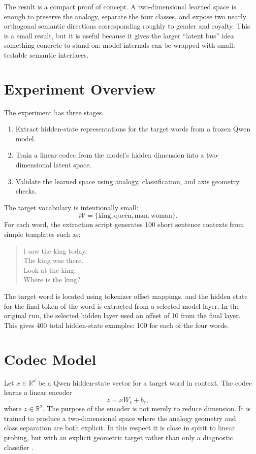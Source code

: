 \documentclass[11pt]{article}
\begin{document}
The result is a compact proof of concept. A two-dimensional learned space is
enough to preserve the analogy, separate the four classes, and expose two
nearly orthogonal semantic directions corresponding roughly to gender and
royalty. This is a small result, but it is useful because it gives the larger
``latent bus'' idea something concrete to stand on: model internals can be
wrapped with small, testable semantic interfaces.

\section{Experiment Overview}

The experiment has three stages.

\begin{enumerate}
  \item Extract hidden-state representations for the target words from a frozen
  Qwen model.
  \item Train a linear codec from the model's hidden dimension into a
  two-dimensional latent space.
  \item Validate the learned space using analogy, classification, and axis
  geometry checks.
\end{enumerate}

The target vocabulary is intentionally small:
\[
  \mathcal{W} = \{\mathrm{king}, \mathrm{queen}, \mathrm{man}, \mathrm{woman}\}.
\]
For each word, the extraction script generates 100 short sentence contexts from
simple templates such as:

\begin{quote}
I saw the king today. \\
The king was there. \\
Look at the king. \\
Where is the king?
\end{quote}

The target word is located using tokenizer offset mappings, and the hidden state
for the final token of the word is extracted from a selected model layer. In
the original run, the selected hidden layer used an offset of 10 from the final
layer. This gives 400 total hidden-state examples: 100 for each of the four
words.

\section{Codec Model}

Let \(x \in \mathbb{R}^d\) be a Qwen hidden-state vector for a target word in
context. The codec learns a linear encoder
\[
  z = x W_e + b_e,
\]
where \(z \in \mathbb{R}^2\). The purpose of the encoder is not merely to reduce
dimension. It is trained to produce a two-dimensional space where the analogy
geometry and class separation are both explicit. In this respect it is close in
spirit to linear probing, but with an explicit geometric target rather than
only a diagnostic classifier \cite{alain2016, belinkov2022}.
\end{document}
